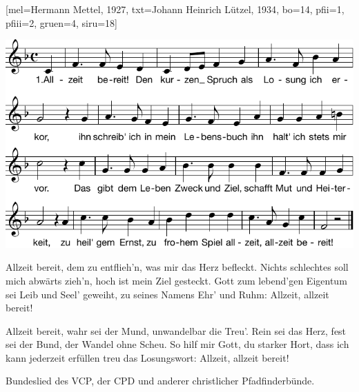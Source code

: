 [mel={Hermann Mettel, 1927}, txt={Johann Heinrich Lützel, 1934}, bo={14}, pfii={1}, pfiii={2}, gruen={4}, siru={18}]

\beginverse 
\endverse  
\centering\includegraphics[width=1\textwidth]{Noten/Lied003.pdf}	

\beginverse
Allzeit bereit, dem zu entflieh'n, was mir das Herz befleckt.
Nichts schlechtes soll mich abwärts zieh'n, hoch ist mein Ziel gesteckt.
Gott zum lebend'gen Eigentum sei Leib und Seel' geweiht,
zu seines Namens Ehr' und Ruhm: Allzeit, allzeit bereit!
\endverse

\beginverse
Allzeit bereit, wahr sei der Mund, unwandelbar die Treu'.
Rein sei das Herz, fest sei der Bund, der Wandel ohne Scheu.
So hilf mir Gott, du starker Hort, dass ich kann jederzeit
erfüllen treu das Losungswort: Allzeit, allzeit bereit!
\endverse

\endsong

\beginscripture{}
Bundeslied des VCP, der CPD und anderer christlicher Pfadfinderbünde.
\endscripture

